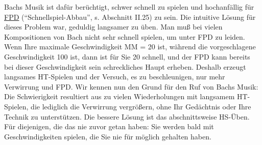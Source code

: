 Bachs Musik ist dafür berüchtigt, schwer schnell zu spielen und hochanfällig für \hyperref[fpd]{FPD} (\enquote{Schnellspiel-Abbau}, s. Abschnitt II.25) zu sein.
Die intuitive Lösung für dieses Problem war, geduldig langsamer zu üben.
Man muß bei vielen Kompositionen von Bach nicht sehr schnell spielen, um unter FPD zu leiden.
Wenn Ihre maximale Geschwindigkeit MM = 20 ist, während die vorgeschlagene Geschwindigkeit 100 ist, dann ist für Sie 20 schnell, und der FPD kann  bereits bei dieser Geschwindigkeit sein schreckliches Haupt erheben.
Deshalb erzeugt langsames HT-Spielen und der Versuch, es zu beschleunigen, nur mehr Verwirrung und FPD.
Wir kennen nun den Grund für den Ruf von Bachs Musik: Die Schwierigkeit resultiert aus zu vielen Wiederholungen mit langsamem HT-Spielen, die lediglich die Verwirrung vergrößern, ohne Ihr Gedächtnis oder Ihre Technik zu unterstützen.
Die bessere Lösung ist das abschnittsweise HS-Üben.
Für diejenigen, die das nie zuvor getan haben: Sie werden bald mit Geschwindigkeiten spielen, die Sie nie für möglich gehalten haben.


\label{ruhig}

